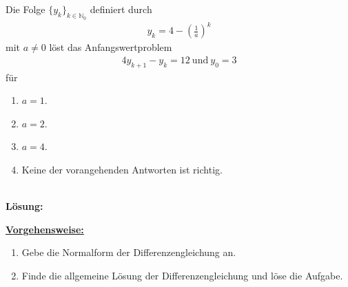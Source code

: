 \newpage

\subsection*{}
Die Folge $\lbrace y_k \rbrace_{k \in \mathbb{N}_0}$ definiert durch
\begin{align*}
y_k =  4 - \left( \frac{1}{a}\right)^k
\end{align*}
mit $a \neq 0$ löst das Anfangswertproblem
\begin{align*}
4 y_{k+1} -y_k = 12 \ \text{und} \ y_0 = 3
\end{align*}
für
\renewcommand{\labelenumi}{(\alph{enumi})}
\begin{enumerate}
\item 
$a= 1$.
\item
$a= 2$.
\item
$a= 4$.
\item
Keine der vorangehenden Antworten ist richtig.
\end{enumerate}
\ \\
\textbf{Lösung:}
\begin{mdframed}
\underline{\textbf{Vorgehensweise:}}
\renewcommand{\labelenumi}{\theenumi.}
\begin{enumerate}
\item Gebe die Normalform der Differenzengleichung an.
\item Finde die allgemeine Lösung der Differenzengleichung und löse die Aufgabe.
\end{enumerate}
\end{mdframed}

